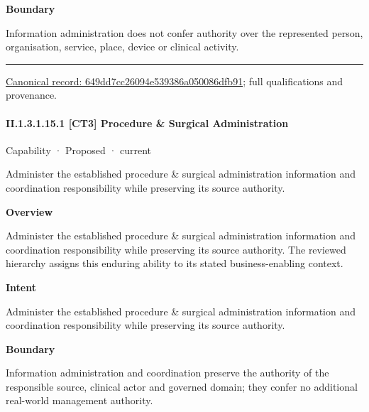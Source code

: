 \textbf{Boundary}



Information administration does not confer authority over the represented person, organisation, service, place, device or clinical activity.



\medskip\hrule\medskip

{\footnotesize \href{../../../../../../../continuum/strategy/capability/649dd7cc26094e539386a050086dfb91.md}{Canonical record: 649dd7cc26094e539386a050086dfb91}; full qualifications and provenance.}\par
\paragraph*{II.1.3.1.15.1 [CT3] Procedure \& Surgical Administration}
\label{navigation:II.1.3.1.15.1}

\label{element:3c4a53dd8c8f468f83ca5d92397dd7e8}
{\small Capability · Proposed · current}\par

Administer the established procedure \& surgical administration information and coordination responsibility while preserving its source authority.



\textbf{Overview}



Administer the established procedure \& surgical administration information and coordination responsibility while preserving its source authority. The reviewed hierarchy assigns this enduring ability to its stated business-enabling context.



\textbf{Intent}



Administer the established procedure \& surgical administration information and coordination responsibility while preserving its source authority.



\textbf{Boundary}



Information administration and coordination preserve the authority of the responsible source, clinical actor and governed domain; they confer no additional real-world management authority.


